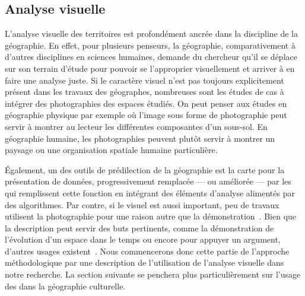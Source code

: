 \subsection{Analyse visuelle}
\label{sub:analyse_visuelle}
L'analyse visuelle des territoires est profondément ancrée dans la discipline de la géographie.
En effet, pour plusieurs penseurs\missref{}, la géographie, comparativement à d'autres disciplines en sciences humaines, demande du chercheur qu'il se déplace sur son terrain d'étude pour pouvoir se l'approprier visuellement et arriver à en faire une analyse juste.
Si le caractère visuel n'est pas toujours explicitement présent dans les travaux des géographes, nombreuses sont les études de cas à intégrer des photographies des espaces étudiés.
On peut penser aux études en géographie physique par exemple où l'image sous forme de photographie peut servir à montrer au lecteur les différentes composantes d'un sous-sol.
En géographie humaine, les photographies peuvent plutôt servir à montrer un paysage ou une organisation spatiale humaine particulière.

Également, un des outils de prédilection de la géographie est la carte pour la présentation de données, progressivement remplacée --- ou améliorée --- par les \sig{} qui remplissent cette fonction en intégrant des éléments d'analyse alimentés par des algorithmes.
Par contre, si le visuel est aussi important, peu de travaux utilisent la photographie pour une raison autre que la démonstration~\citep[151]{Rose2008}.
Bien que la description peut servir des buts pertinents, comme la démonstration de l'évolution d'un espace dans le temps ou encore pour appuyer un argument, d'autres usages existent~\parencite[158]{Rose2008}.
Nous commencerons donc cette partie de l'approche méthodologique par une description de l'utilisation de l'analyse visuelle dans notre recherche.
La section suivante se penchera plus particulièrement sur l'usage des \sig{} dans la géographie culturelle.


